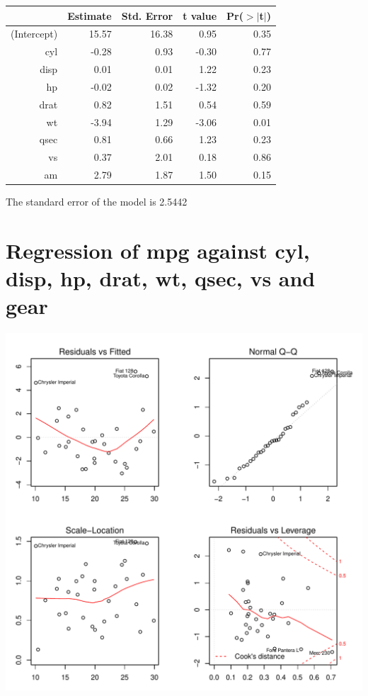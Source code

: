 \documentclass{article}\usepackage[]{graphicx}\usepackage[]{color}
\makeatletter
\def\maxwidth{ %
  \ifdim\Gin@nat@width>\linewidth
    \linewidth
  \else
    \Gin@nat@width
  \fi
}
\newenvironment{knitrout}{}{} %
\makeatother
\begin{document}
\begin{table}[ht]
\centering
\begin{tabular}{rrrrr}
  \hline
 & Estimate & Std. Error & t value & Pr($>$$|$t$|$) \\ 
  \hline
(Intercept) & 15.57 & 16.38 & 0.95 & 0.35 \\ 
  cyl & -0.28 & 0.93 & -0.30 & 0.77 \\ 
  disp & 0.01 & 0.01 & 1.22 & 0.23 \\ 
  hp & -0.02 & 0.02 & -1.32 & 0.20 \\ 
  drat & 0.82 & 1.51 & 0.54 & 0.59 \\ 
  wt & -3.94 & 1.29 & -3.06 & 0.01 \\ 
  qsec & 0.81 & 0.66 & 1.23 & 0.23 \\ 
  vs & 0.37 & 2.01 & 0.18 & 0.86 \\ 
  am & 2.79 & 1.87 & 1.50 & 0.15 \\ 
   \hline
\end{tabular}
\end{table}




The standard error of the model is 2.5442

\newpage

\section{Regression of mpg against cyl, disp, hp, drat, wt, qsec, vs and gear }
\begin{knitrout}
\color{fgcolor}

{\centering \includegraphics[width=\maxwidth]{figure/lm-cyl-disp-hp-drat-wt-qsec-vs-gear} 

}



\end{knitrout}
\end{document}
